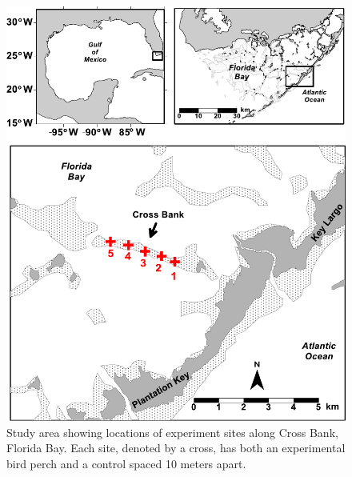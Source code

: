 \renewcommand{\section}[2]{}%


\endgroup


\begin{figure}
  \centering
  \includegraphics[width=.99\textwidth]{Figures/chapter1/chart1map}
\caption[Study area showing locations of experiment sites along Cross Bank, Florida Bay. Each site, denoted by a cross, has both an experimental bird perch and a control spaced 10 meters apart]{Study area showing locations of experiment sites along Cross Bank, Florida Bay. Each site, denoted by a cross, has both an experimental bird perch and a control spaced 10 meters apart.}
  \label{fig:map}
\end{figure}


